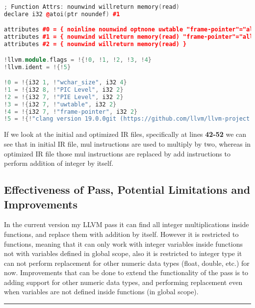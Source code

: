 \documentclass[16pt]{article}
\begin{document}
\begin{lstlisting}[caption=Optimized IR File, label=optimized_mul_to_add.ll,
style=chstyle,language=C++]
; Function Attrs: nounwind willreturn memory(read)
declare i32 @atoi(ptr noundef) #1

attributes #0 = { noinline nounwind optnone uwtable "frame-pointer"="all" "min-legal-vector-width"="0" "no-trapping-math"="true" "stack-protector-buffer-size"="8" "target-cpu"="x86-64" "target-features"="+cmov,+cx8,+fxsr,+mmx,+sse,+sse2,+x87" "tune-cpu"="generic" }
attributes #1 = { nounwind willreturn memory(read) "frame-pointer"="all" "no-trapping-math"="true" "stack-protector-buffer-size"="8" "target-cpu"="x86-64" "target-features"="+cmov,+cx8,+fxsr,+mmx,+sse,+sse2,+x87" "tune-cpu"="generic" }
attributes #2 = { nounwind willreturn memory(read) }

!llvm.module.flags = !{!0, !1, !2, !3, !4}
!llvm.ident = !{!5}

!0 = !{i32 1, !"wchar_size", i32 4}
!1 = !{i32 8, !"PIC Level", i32 2}
!2 = !{i32 7, !"PIE Level", i32 2}
!3 = !{i32 7, !"uwtable", i32 2}
!4 = !{i32 7, !"frame-pointer", i32 2}
!5 = !{!"clang version 19.0.0git (https://github.com/llvm/llvm-project.git 790bcecce6c135476d2551805c09ed670b9f8418)"}
\end{lstlisting}

If we look at the initial and optimized IR files, specifically at lines \textbf{42-52} we can see that in initial IR file, mul instructions are used to multiply by two, whereas in optimized IR file those mul instructions are replaced by add instructions to perform addition of integer by itself.

\subsection{Effectiveness of Pass, Potential Limitations and Improvements}
In the current version my LLVM pass it can find all integer multiplications inside functions, and replace them with addition by itself.
However it is restricted to functions, meaning that it can only work with integer variables inside functions not with variables defined in global scope, also it is restricted to integer type it can not perform replacement for other numeric data types (float, double, etc.) for now. Improvements that can be done to extend the functionality of the pass is to adding support for other numeric data types, and performing replacement even when variables are not defined inside functions (in global scope). 

\newpage
\hrule
\printbibliography[title={References}] %
\end{document}
